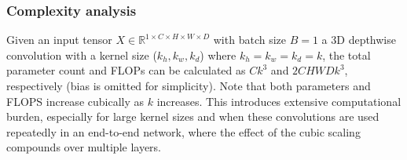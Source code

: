 



\subsubsection*{Complexity analysis}
Given an input tensor \( X \in \mathbb{R}^{1 \times C \times H \times W \times D} \) with batch size \( B=1 \) a 3D depthwise convolution \cite{chollet2017xception} with a kernel size ($k_h, k_w, k_d$) where $k_h = k_w = k_d = k$, the total parameter count and FLOPs can be calculated as $Ck^3$ and $2CHWDk^3$, respectively (bias is omitted for simplicity). Note that both parameters and FLOPS increase cubically as $k$ increases. This introduces extensive computational burden, especially for large kernel sizes and when these convolutions are used repeatedly in an end-to-end network, where the effect of the cubic scaling compounds over multiple layers. 

